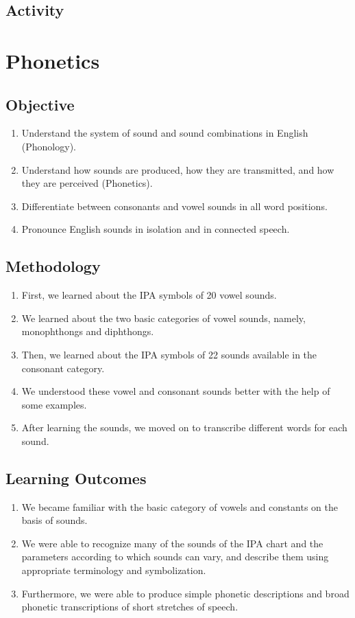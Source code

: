 \subsection{Activity}

\pagebreak

\section{Phonetics}
\label{Phonetics}
\subsection{Objective}
\begin{enumerate}
    \item Understand the system of sound and sound combinations in English (Phonology).
    \item Understand how sounds are produced, how they are transmitted, and how they are
          perceived (Phonetics).
    \item Differentiate between consonants and vowel sounds in all word positions.
    \item Pronounce English sounds in isolation and in connected speech.
\end{enumerate}

\subsection{Methodology}
\begin{enumerate}
    \item First, we learned about the IPA symbols of 20 vowel sounds.
    \item We learned about the two basic categories of vowel sounds, namely, monophthongs
          and diphthongs.
    \item Then, we learned about the IPA symbols of 22 sounds available in the consonant
          category.
    \item We understood these vowel and consonant sounds better with the help of some
          examples.
    \item After learning the sounds, we moved on to transcribe different words for each sound.
\end{enumerate}

\subsection{Learning Outcomes}
\begin{enumerate}
    \item We became familiar with the basic category of vowels and constants on the basis of
          sounds.
    \item We were able to recognize many of the sounds of the IPA chart and the parameters
          according to which sounds can vary, and describe them using appropriate terminology
          and symbolization.
    \item Furthermore, we were able to produce simple phonetic descriptions and broad phonetic
          transcriptions of short stretches of speech.
\end{enumerate}

